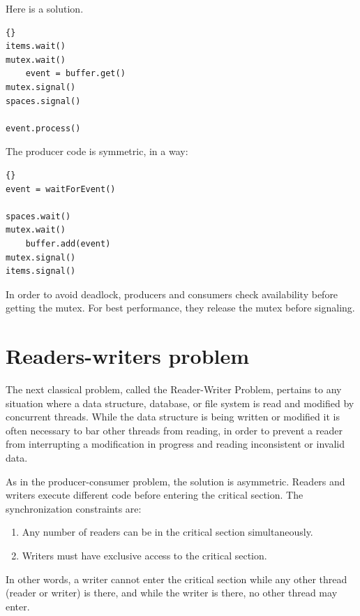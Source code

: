 \documentclass{book}
\begin{document}
Here is a solution.

\begin{lstlisting}[title={Finite buffer consumer solution}]{}
items.wait()
mutex.wait()
    event = buffer.get()
mutex.signal()
spaces.signal()

event.process()
\end{lstlisting}

The producer code is symmetric, in a way:

\begin{lstlisting}[title={Finite buffer producer solution}]{}
event = waitForEvent()

spaces.wait()
mutex.wait()
    buffer.add(event)
mutex.signal()
items.signal()
\end{lstlisting}

In order to avoid deadlock, producers and consumers check
availability before getting the mutex.  For best performance,
they release the mutex before signaling.


\section{Readers-writers problem} 

The next classical problem, called the Reader-Writer Problem, pertains
to any situation where a data structure, database, or file system is
read and modified by concurrent threads.  While the data structure is
being written or modified it is often necessary to bar other threads
from reading, in order to prevent a reader from interrupting a
modification in progress and reading inconsistent or invalid data.

As in the producer-consumer problem, the solution is asymmetric.
Readers and writers execute different code before entering the
critical section.  The synchronization constraints are:

\begin{enumerate}

\item Any number of readers can be in the critical section
simultaneously.

\item Writers must have exclusive access to the critical section.

\end{enumerate}

In other words, a writer cannot enter the critical section while
any other thread (reader or writer) is there, and while the writer
is there, no other thread may enter.
\end{document}
